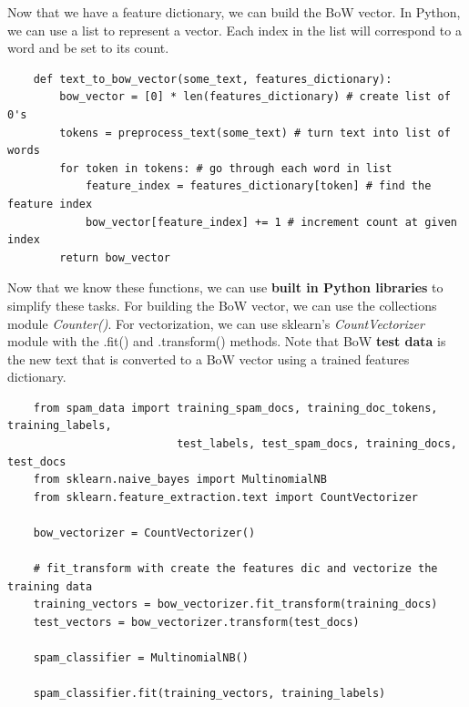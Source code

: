 \documentclass[11pt, a4paper]{article}
\begin{document}
\begin{spacing}{1.1}
	\noindent Now that we have a feature dictionary, we can build the BoW vector. In Python, we can use a list to represent a vector. Each index in the list will correspond to a word and be set to its count. 
	\begin{lstlisting}
	def text_to_bow_vector(some_text, features_dictionary):
		bow_vector = [0] * len(features_dictionary) # create list of 0's
		tokens = preprocess_text(some_text) # turn text into list of words
		for token in tokens: # go through each word in list
			feature_index = features_dictionary[token] # find the feature index
			bow_vector[feature_index] += 1 # increment count at given index
		return bow_vector	\end{lstlisting} \vspace*{1mm}
	Now that we know these functions, we can use \textbf{built in Python libraries} to simplify these tasks. For building the BoW vector, we can use the collections module \textit{Counter()}. For vectorization, we can use sklearn's \textit{CountVectorizer} module with the .fit() and .transform() methods. Note that BoW \textbf{test data} is the new text that is converted to a BoW vector using a trained features dictionary.
	\begin{lstlisting}
	from spam_data import training_spam_docs, training_doc_tokens, training_labels, 
	                      test_labels, test_spam_docs, training_docs, test_docs
	from sklearn.naive_bayes import MultinomialNB
	from sklearn.feature_extraction.text import CountVectorizer
	
	bow_vectorizer = CountVectorizer()
	
	# fit_transform with create the features dic and vectorize the training data
	training_vectors = bow_vectorizer.fit_transform(training_docs)
	test_vectors = bow_vectorizer.transform(test_docs)
	
	spam_classifier = MultinomialNB()
	
	spam_classifier.fit(training_vectors, training_labels)
	

\end{lstlisting}
\end{spacing}
\end{document}

